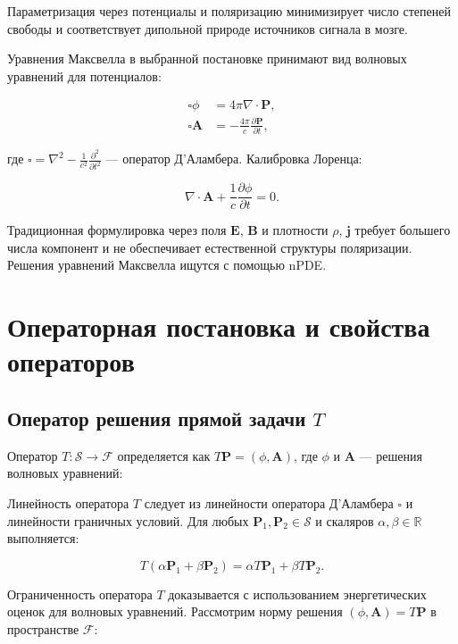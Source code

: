 \documentclass[a4paper,14pt,oneside,openany]{extarticle}
\begin{document}
Параметризация через потенциалы и поляризацию минимизирует число степеней свободы и соответствует дипольной природе источников сигнала в мозге.

Уравнения Максвелла в выбранной постановке принимают вид волновых уравнений для потенциалов:

\begin{align}
    \square \phi &= 4\pi \nabla \cdot \mathbf{P}, \label{eq:wave_phi} \\
    \square \mathbf{A} &= -\frac{4\pi}{c} \frac{\partial \mathbf{P}}{\partial t}, \label{eq:wave_A}
\end{align}

где $\square = \nabla^2 - \frac{1}{c^2} \frac{\partial^2}{\partial t^2}$ --- оператор Д’Аламбера. Калибровка Лоренца:

\begin{equation}
    \nabla \cdot \mathbf{A} + \frac{1}{c} \frac{\partial \phi}{\partial t} = 0.
\end{equation}

Традиционная формулировка через поля $\mathbf{E}$, $\mathbf{B}$ и плотности $\rho$, $\mathbf{j}$ требует большего числа компонент и не обеспечивает естественной структуры поляризации. Решения уравнений Максвелла ищутся с помощью nPDE\cite{Zubov2021}.

\newpage
\section{Операторная постановка и свойства операторов}
\label{sec:operator_properties}

\subsection{Оператор решения прямой задачи $T$}
Оператор $T: \mathcal{S} \to \mathcal{F}$ определяется как $T\mathbf{P} = (\phi, \mathbf{A})$, где $\phi$ и $\mathbf{A}$ --- решения волновых уравнений:

Линейность оператора $T$ следует из линейности оператора Д’Аламбера $\square$ и линейности граничных условий. Для любых $\mathbf{P}_1, \mathbf{P}_2 \in \mathcal{S}$ и скаляров $\alpha, \beta \in \mathbb{R}$ выполняется:

\begin{equation}
    T(\alpha \mathbf{P}_1 + \beta \mathbf{P}_2) = \alpha T\mathbf{P}_1 + \beta T\mathbf{P}_2.
\end{equation}

Ограниченность оператора $T$ доказывается с использованием энергетических оценок для волновых уравнений. Рассмотрим норму решения $(\phi, \mathbf{A}) = T\mathbf{P}$ в пространстве $\mathcal{F}$:
\end{document}
